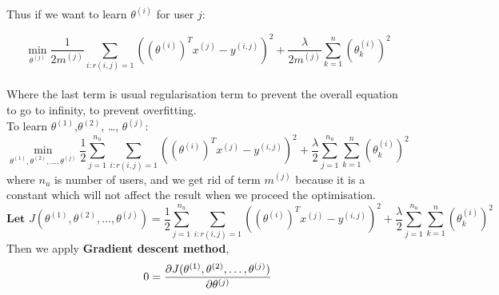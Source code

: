 Thus if we want to learn $\theta^{(i)}$ for user $j$:

\begin{equation*}
\min_{\theta^{(j)}} \frac{1}{2m^{(j)}}\sum_{i:r(i,j) = 1}\left((\theta^{(i)})^{T}x^{(j)}-y^{(i,j)}\right)^{2} + \frac{\lambda}{2m^{(j)}}\sum_{k = 1}^{n}(\theta^{(i)}_{k})^{2}
\end{equation*}
\\Where the last term is usual regularisation term to prevent the overall equation to go to infinity, to prevent overfitting.
\\ To learn $\theta^{(1)}$,$\theta^{(2)}$, \dots, $\theta^{(j)}$:
\begin{equation*}
\min_{\theta^{(1)},\theta^{(2)}, \dots, \theta^{(j)}} \frac{1}{2}\sum_{j = 1}^{n_{u}}\sum_{i:r(i,j) = 1}\left((\theta^{(i)})^{T}x^{(j)}-y^{(i,j)}\right)^{2} + \frac{\lambda}{2}\sum_{j = 1}^{n_{u}}\sum_{k = 1}^{n}(\theta^{(i)}_{k})^{2}
\end{equation*}
where $n_{u}$ is number of users, and we get rid of term $m^{(j)}$ because it is a constant which will not affect the result when we proceed the optimisation.
\begin{equation*}
\textbf{Let     } J(\theta^{(1)},\theta^{(2)}, \dots, \theta^{(j)}) = \frac{1}{2}\sum_{j = 1}^{n_{u}}\sum_{i:r(i,j) = 1}\left((\theta^{(i)})^{T}x^{(j)}-y^{(i,j)}\right)^{2} + \frac{\lambda}{2}\sum_{j = 1}^{n_{u}}\sum_{k = 1}^{n}(\theta^{(i)}_{k})^{2}
\end{equation*}
Then we apply \textbf{Gradient descent method}, 
\begin{equation*}
\\ 0 = \frac{\partial{J(\theta^{(1)},\theta^{(2)}, \dots, \theta^{(j)})}} {\partial{\theta^{(j)}}}
\end{equation*}

